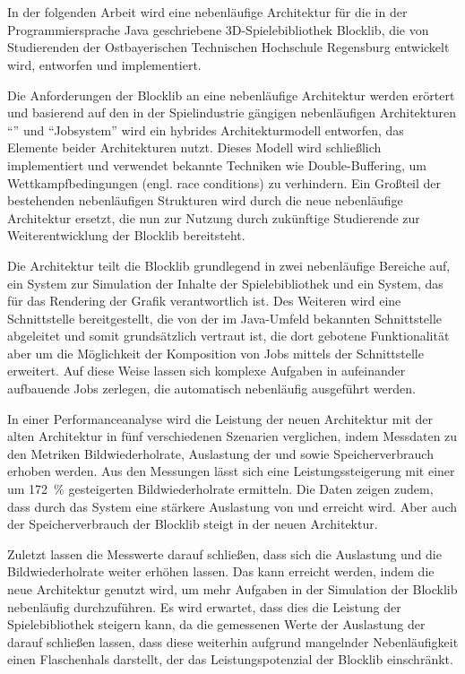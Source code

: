 \section*{\abstractname} 

\bigskip 

In der folgenden Arbeit wird eine nebenläufige Architektur für die in der Programmiersprache Java geschriebene 3D-Spielebibliothek Blocklib, die von Studierenden der Ostbayerischen Technischen Hochschule Regensburg entwickelt wird, entworfen und implementiert.

Die Anforderungen der Blocklib an eine nebenläufige Architektur werden erörtert und basierend auf den in der Spielindustrie gängigen nebenläufigen Architekturen \enquote{} und \enquote{Jobsystem} wird ein hybrides Architekturmodell entworfen, das Elemente beider Architekturen nutzt. Dieses Modell wird schließlich implementiert und verwendet bekannte Techniken wie Double-Buffering, um Wettkampfbedingungen (engl. race conditions) zu verhindern. Ein Großteil der bestehenden nebenläufigen Strukturen wird durch die neue nebenläufige Architektur ersetzt, die nun zur Nutzung durch zukünftige Studierende zur Weiterentwicklung der Blocklib bereitsteht.

Die Architektur teilt die Blocklib grundlegend in zwei nebenläufige Bereiche auf, ein System zur Simulation der Inhalte der Spielebibliothek und ein System, das für das Rendering der Grafik verantwortlich ist. Des Weiteren wird eine Schnittstelle bereitgestellt, die von der im Java-Umfeld bekannten Schnittstelle \classScheduledExecutorService{} abgeleitet und somit grundsätzlich vertraut ist, die dort gebotene Funktionalität aber um die Möglichkeit der Komposition von Jobs mittels der Schnittstelle \classCompletionStage{} erweitert. Auf diese Weise lassen sich komplexe Aufgaben in aufeinander aufbauende Jobs zerlegen, die automatisch nebenläufig ausgeführt werden.

In einer Performanceanalyse wird die Leistung der neuen Architektur mit der alten Architektur in fünf verschiedenen Szenarien verglichen, indem Messdaten zu den Metriken Bildwiederholrate, Auslastung der  und  sowie Speicherverbrauch erhoben werden. Aus den Messungen lässt sich eine Leistungssteigerung mit einer um \SI{172}{\percent} gesteigerten Bildwiederholrate ermitteln. Die Daten zeigen zudem, dass durch das System eine stärkere Auslastung von  und  erreicht wird. Aber auch der Speicherverbrauch der Blocklib steigt in der neuen Architektur.
	
Zuletzt lassen die Messwerte darauf schließen, dass sich die Auslastung und die Bildwiederholrate weiter erhöhen lassen. Das kann erreicht werden, indem die neue Architektur genutzt wird, um mehr Aufgaben in der Simulation der Blocklib nebenläufig durchzuführen. Es wird erwartet, dass dies die Leistung der Spielebibliothek steigern kann, da die gemessenen Werte der Auslastung der  darauf schließen lassen, dass diese weiterhin aufgrund mangelnder Nebenläufigkeit einen Flaschenhals darstellt, der das Leistungspotenzial der Blocklib einschränkt.